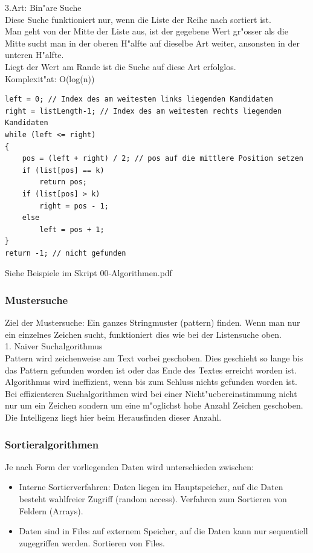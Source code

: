 3.Art: Bin"are Suche\\
Diese Suche funktioniert nur, wenn die Liste der Reihe nach sortiert ist.\\
Man geht von der Mitte der Liste aus, ist der gegebene Wert gr"osser als die Mitte sucht man in der oberen H"alfte auf dieselbe Art weiter, ansonsten in der unteren H"alfte.\\
Liegt der Wert am Rande ist die Suche auf diese Art erfolglos.\\
Komplexit"at: O(log(n))\\
\begin{lstlisting}[style=C]
left = 0; // Index des am weitesten links liegenden Kandidaten
right = listLength-1; // Index des am weitesten rechts liegenden Kandidaten
while (left <= right)
{
	pos = (left + right) / 2; // pos auf die mittlere Position setzen
	if (list[pos] == k)
		return pos;
	if (list[pos] > k)
		right = pos - 1;
	else
		left = pos + 1;
}
return -1; // nicht gefunden

\end{lstlisting} 
Siehe Beispiele im Skript 00-Algorithmen.pdf

\subsubsection{Mustersuche}
Ziel der Mustersuche: Ein ganzes Stringmuster (pattern) finden. Wenn man nur ein einzelnes Zeichen sucht, funktioniert dies wie bei der Listensuche oben.\\
1. Naiver Suchalgorithmus\\
Pattern wird zeichenweise am Text vorbei geschoben. Dies geschieht so lange bis das Pattern gefunden worden ist oder das Ende des Textes erreicht worden ist. Algorithmus wird ineffizient, wenn bis zum Schluss nichts gefunden worden ist.\\
Bei effizienteren Suchalgorithmen wird bei einer Nicht"uebereinstimmung nicht nur um ein Zeichen sondern um eine m"oglichst hohe Anzahl Zeichen geschoben. Die Intelligenz liegt hier beim Herausfinden dieser Anzahl.\\



\subsubsection{Sortieralgorithmen}
Je nach Form der vorliegenden Daten wird unterschieden zwischen: 
\begin{itemize}
\item Interne Sortierverfahren: Daten liegen im Hauptspeicher, auf die Daten besteht wahlfreier Zugriff (random access). Verfahren zum Sortieren von Feldern (Arrays).
\item Daten sind in Files auf externem Speicher, auf die Daten kann nur sequentiell zugegriffen werden. Sortieren von Files. 
\end{itemize}

